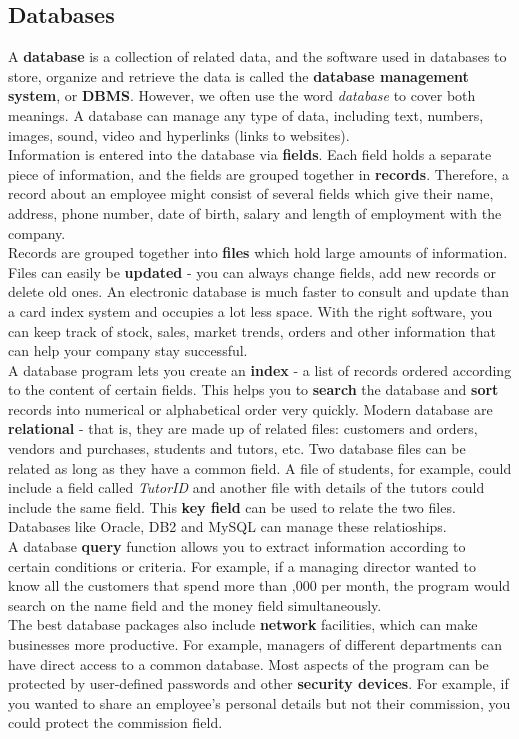 \documentclass[a4paper,8pt]{article}
\begin{document}
\subsection{Databases}
A \textbf{database} is a collection of related data, and the software used in
databases to store, organize and retrieve the data is called the \textbf{database
management system}, or \textbf{DBMS}. However, we often use the word \textsl{database}
to cover both meanings. A database can manage any type of data, including text, numbers, images,
sound, video and hyperlinks (links to websites).\\
Information is entered into the database via \textbf{fields}. Each field holds a separate piece of
information, and the fields are grouped together in \textbf{records}. Therefore, a record
about an employee might consist of several fields which give their name, address, phone number,
date of birth, salary and length of employment with the company.\\
Records are grouped together into \textbf{files} which hold large amounts of information.
Files can easily be \textbf{updated} - you can always change fields, add new records
or delete old ones. An electronic database is much faster to consult and update
than a card index system and occupies a lot less space. With the right software,
you can keep track of stock, sales, market trends, orders and other information
that can help your company stay successful.\\
A database program lets you create an \textbf{index} - a list of records
ordered according to the content of certain fields. This helps you to \textbf{search}
the database and \textbf{sort} records into numerical or alphabetical order very quickly.
Modern database are \textbf{relational} - that is, they are made up of
related files: customers and orders, vendors and purchases, students and tutors, etc.
Two database files can be related as long as they have a common field. A file
of students, for example, could include a field called \textsl{TutorID} and another file
with details of the tutors could include the same field. This \textbf{key field} can be used
to relate the two files. Databases like Oracle, DB2 and MySQL can manage these relatioships.\\
A database \textbf{query} function allows you to extract information according to certain
conditions or criteria. For example, if a managing director wanted to know all the
customers that spend more than ,000 per month, the program would search
on the name field and the money field simultaneously.\\ The best database packages
also include \textbf{network} facilities, which can make businesses more productive.
For example, managers of different departments can have direct access to a common database.
Most aspects of the program can be protected by user-defined passwords and other
\textbf{security devices}. For example, if you wanted to share an employee's
personal details but not their commission, you could protect the commission field.
\end{document}
